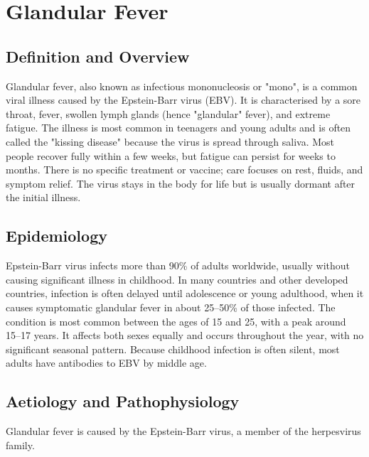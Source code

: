 \chapter{Glandular Fever}

\section*{Definition and Overview}
Glandular fever, also known as infectious mononucleosis or "mono", is a common viral illness caused by the Epstein-Barr virus (EBV). It is characterised by a sore throat, fever, swollen lymph glands (hence "glandular" fever), and extreme fatigue. The illness is most common in teenagers and young adults and is often called the "kissing disease" because the virus is spread through saliva. Most people recover fully within a few weeks, but fatigue can persist for weeks to months. There is no specific treatment or vaccine; care focuses on rest, fluids, and symptom relief. The virus stays in the body for life but is usually dormant after the initial illness.

\section*{Epidemiology}
Epstein-Barr virus infects more than 90\% of adults worldwide, usually without causing significant illness in childhood. In many countries and other developed countries, infection is often delayed until adolescence or young adulthood, when it causes symptomatic glandular fever in about 25--50\% of those infected. The condition is most common between the ages of 15 and 25, with a peak around 15--17 years. It affects both sexes equally and occurs throughout the year, with no significant seasonal pattern. Because childhood infection is often silent, most adults have antibodies to EBV by middle age.

\section*{Aetiology and Pathophysiology}
Glandular fever is caused by the Epstein-Barr virus, a member of the herpesvirus family.

